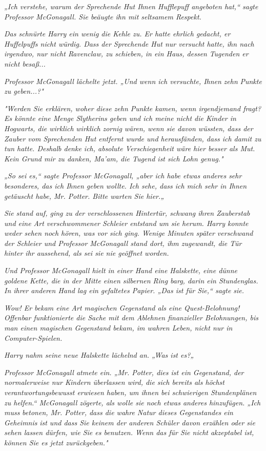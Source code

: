 {\emph{„Ich verstehe, warum der Sprechende Hut Ihnen Hufflepuff angeboten hat,“ sagte Professor McGonagall. Sie beäugte ihn mit seltsamem Respekt.}

\emph{Das schnürte Harry ein wenig die Kehle zu. Er hatte ehrlich gedacht, er Huffelpuffs nicht würdig. Dass der Sprechende Hut nur versucht hatte, ihn nach irgendwo, nur nicht Ravenclaw, zu schieben, in ein Haus, dessen} \emph{Tugenden er nicht besaß...}

\emph{Professor McGonagall lächelte jetzt. „Und wenn ich versuchte, Ihnen} \emph{\emph{zehn}} \emph{Punkte zu geben...?"}

\emph{"Werden Sie erklären, woher diese zehn Punkte kamen, wenn irgendjemand fragt? Es könnte eine Menge Slytherins geben und ich meine nicht die Kinder in Hogwarts, die wirklich} \emph{\emph{wirklich}} \emph{zornig wären, wenn sie davon wüssten, dass der Zauber vom Sprechenden Hut entfernt wurde und herausfänden, dass ich damit zu tun hatte. Deshalb denke ich, absolute Verschiegenheit wäre hier besser als Mut. Kein Grund mir zu danken, Ma'am, die Tugend ist sich Lohn genug."}

\emph{„So sei es,“ sagte Professor McGonagall, „aber ich habe etwas anderes sehr besonderes, das ich Ihnen geben wollte. Ich sehe, dass ich mich sehr in Ihnen getäuscht habe, Mr. Potter. Bitte warten Sie hier.„}

\emph{Sie stand auf, ging zu der verschlossenen Hintertür, schwang ihren Zauberstab und eine Art verschwommener Schleier entstand um sie herum. Harry konnte weder sehen noch hören, was vor sich ging. Wenige Minuten später verschwand der Schleier und Professor McGonagall stand dort, ihm zugewandt, die Tür hinter ihr aussehend, als sei sie nie geöffnet worden.}

\emph{Und Professor McGonagall hielt in einer Hand eine Halskette, eine dünne goldene Kette, die in der Mitte einen silbernen Ring barg, darin ein Stundenglas. In ihrer anderen Hand lag ein gefaltetes Papier. „Das ist für Sie,“ sagte sie.}

\emph{Wow! Er bekam eine Art magischen Gegenstand als eine Quest-Belohnung! Offenbar funktionierte die Sache mit dem Ablehnen finanzieller Belohnungen, bis man einen magischen Gegenstand bekam, im wahren Leben, nicht nur in Computer-Spielen.}

\emph{Harry nahm seine neue Halskette lächelnd an. „Was ist es?„}

\emph{Professor McGonagall atmete ein. „Mr. Potter, dies ist ein Gegenstand, der normalerweise nur Kindern überlassen wird, die sich bereits als höchst verantwortungsbewusst erwiesen haben, um ihnen bei schwierigen Stundenplänen zu helfen.“ McGonagall zögerte, als wolle sie noch etwas anderes hinzufügen. „Ich} \emph{\emph{muss}} \emph{betonen, Mr. Potter, dass die wahre Natur dieses Gegenstandes ein} \emph{\emph{Geheimnis}} \emph{ist und dass Sie keinem der anderen Schüler davon erzählen oder sie sehen lassen dürfen, wie Sie es benutzen. Wenn das für Sie nicht akzeptabel ist, können Sie es jetzt zurückgeben."}

}
